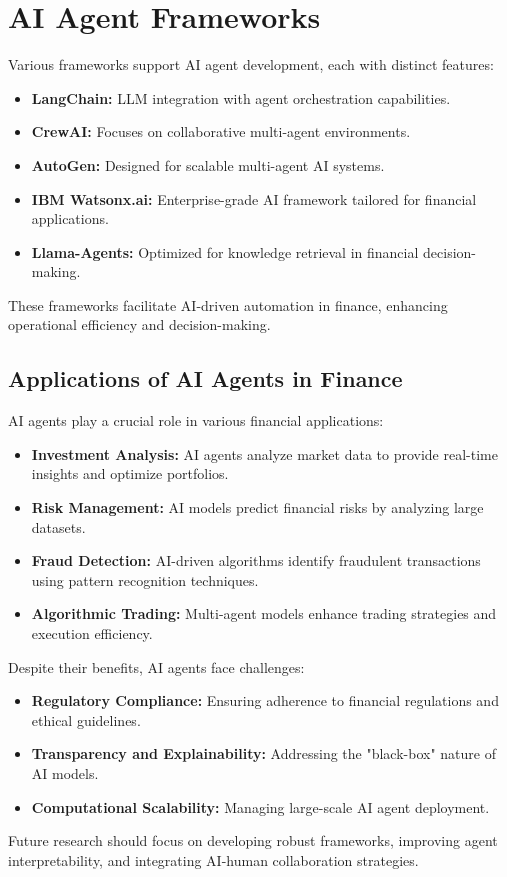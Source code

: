 \documentclass[a4paper,headinclude=on,footinclude=on,12pt,oneside]{scrbook}
\begin{document}
\section{AI Agent Frameworks}
Various frameworks support AI agent development, each with distinct features:
\begin{itemize}
	\item \textbf{LangChain:} LLM integration with agent orchestration capabilities.
	\item \textbf{CrewAI:} Focuses on collaborative multi-agent environments.
	\item \textbf{AutoGen:} Designed for scalable multi-agent AI systems.
	\item \textbf{IBM Watsonx.ai:} Enterprise-grade AI framework tailored for financial applications.
	\item \textbf{Llama-Agents:} Optimized for knowledge retrieval in financial decision-making.
\end{itemize}
These frameworks facilitate AI-driven automation in finance, enhancing operational efficiency and decision-making.

\subsection{Applications of AI Agents in Finance}
AI agents play a crucial role in various financial applications:
\begin{itemize}
	\item \textbf{Investment Analysis:} AI agents analyze market data to provide real-time insights and optimize portfolios.
	\item \textbf{Risk Management:} AI models predict financial risks by analyzing large datasets.
	\item \textbf{Fraud Detection:} AI-driven algorithms identify fraudulent transactions using pattern recognition techniques.
	\item \textbf{Algorithmic Trading:} Multi-agent models enhance trading strategies and execution efficiency.
\end{itemize}

Despite their benefits, AI agents face challenges:
\begin{itemize}
	\item \textbf{Regulatory Compliance:} Ensuring adherence to financial regulations and ethical guidelines.
	\item \textbf{Transparency and Explainability:} Addressing the "black-box" nature of AI models.
	\item \textbf{Computational Scalability:} Managing large-scale AI agent deployment.
\end{itemize}
Future research should focus on developing robust frameworks, improving agent interpretability, and integrating AI-human collaboration strategies.
\end{document}
